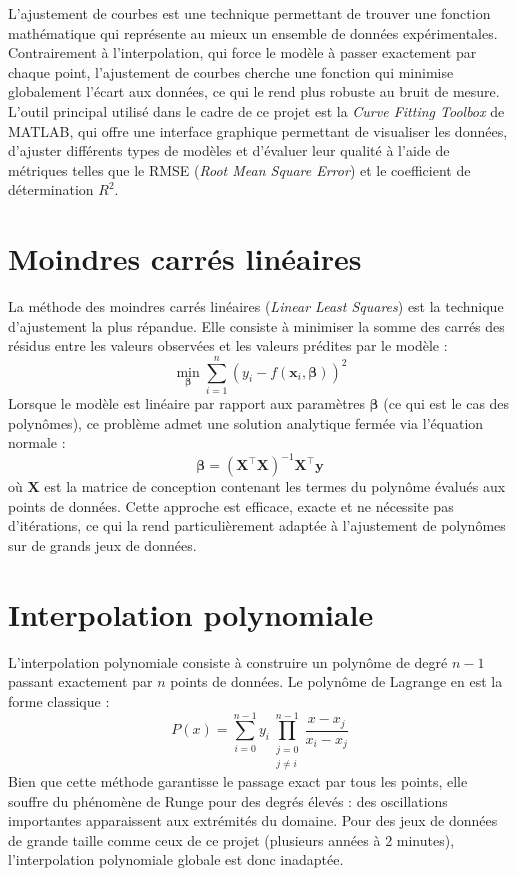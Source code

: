 \documentclass[12pt, letterpaper]{report}
\begin{document}
L'ajustement de courbes est une technique permettant de trouver une fonction mathématique qui représente au mieux un ensemble de données expérimentales. Contrairement à l'interpolation, qui force le modèle à passer exactement par chaque point, l'ajustement de courbes cherche une fonction qui minimise globalement l'écart aux données, ce qui le rend plus robuste au bruit de mesure. L'outil principal utilisé dans le cadre de ce projet est la \textit{Curve Fitting Toolbox} de MATLAB, qui offre une interface graphique permettant de visualiser les données, d'ajuster différents types de modèles et d'évaluer leur qualité à l'aide de métriques telles que le RMSE (\textit{Root Mean Square Error}) et le coefficient de détermination $R^2$.

\section{Moindres carrés linéaires}

La méthode des moindres carrés linéaires (\textit{Linear Least Squares}) est la technique d'ajustement la plus répandue. Elle consiste à minimiser la somme des carrés des résidus entre les valeurs observées et les valeurs prédites par le modèle :
\begin{equation}
  \min_{\boldsymbol{\beta}} \sum_{i=1}^{n} \left(y_i - f(\mathbf{x}_i, \boldsymbol{\beta})\right)^2
\end{equation}
Lorsque le modèle est linéaire par rapport aux paramètres $\boldsymbol{\beta}$ (ce qui est le cas des polynômes), ce problème admet une solution analytique fermée via l'équation normale :
\begin{equation}
  \boldsymbol{\beta} = (\mathbf{X}^\top \mathbf{X})^{-1} \mathbf{X}^\top \mathbf{y}
\end{equation}
où $\mathbf{X}$ est la matrice de conception contenant les termes du polynôme évalués aux points de données. Cette approche est efficace, exacte et ne nécessite pas d'itérations, ce qui la rend particulièrement adaptée à l'ajustement de polynômes sur de grands jeux de données.

\section{Interpolation polynomiale}

L'interpolation polynomiale consiste à construire un polynôme de degré $n-1$ passant exactement par $n$ points de données. Le polynôme de Lagrange en est la forme classique :
\begin{equation}
  P(x) = \sum_{i=0}^{n-1} y_i \prod_{\substack{j=0 \\ j \neq i}}^{n-1} \frac{x - x_j}{x_i - x_j}
\end{equation}
Bien que cette méthode garantisse le passage exact par tous les points, elle souffre du phénomène de Runge pour des degrés élevés : des oscillations importantes apparaissent aux extrémités du domaine. Pour des jeux de données de grande taille comme ceux de ce projet (plusieurs années à 2 minutes), l'interpolation polynomiale globale est donc inadaptée.
\end{document}
